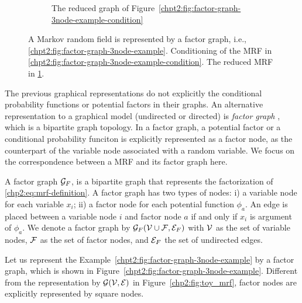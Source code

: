 \begin{figure}[!t]
\begin{subfigure}{.3\textwidth}
    \caption{The reduced graph of Figure~\ref{chpt2:fig:factor-graph-3node-example-condition}}
    \label{chpt2:fig:factor-graph-3node-example-reduced}
  \end{subfigure}
  
  \caption{A Markov random field is represented by a factor graph, i.e., \ref{chpt2:fig:factor-graph-3node-example}. Conditioning of the MRF in \ref{chpt2:fig:factor-graph-3node-example-condition}. The reduced MRF in \ref{chpt2:fig:factor-graph-3node-example-reduced}.}
  \label{chp2:tab:toy-factor-graph}
  \hspace{1cm}
\end{figure}

The previous graphical representations do not explicitly the conditional probability functions or potential factors in their graphs. An alternative representation to a graphical model (undirected or directed) is \textit{factor graph} \cite{kschischang2001factor_graph},
which is a bipartite graph topology. In a factor graph, a potential factor or a conditional probability funciton is explicitly represented as a factor node, as the counterpart of the variable node associated with a random variable. We focus on the correspondence between a MRF and its factor graph here.
\begin{definition}\label{chpt2:def:factor-graph}
  A factor graph $\mathcal{G}_F$, is a bipartite graph that represents the factorization of \eqref{chp2:eq:mrf-definition}. A factor graph has two types of nodes: i) a variable node for each variable $x_i$; ii) a factor node for each potential function $\phi_{a}$. An edge is placed between a variable node $i$ and factor node $a$ if and only if $x_i$ is argument of $\phi_{a}$. We denote a factor graph by $\mathcal{G}_F(\mathcal{V} \cup \mathcal{F}, \mathcal{E}_F)$ with $\mathcal{V}$ as the set of variable nodes, $\mathcal{F}$ as the set of factor nodes, and $\mathcal{E}_F$ the set of undirected edges.
\end{definition}
\begin{example}
  Let us represent the Example~\ref{chpt2:fig:factor-graph-3node-example} by a factor graph, which is shown in Figure~\ref{chpt2:fig:factor-graph-3node-example}. Different from the representation by $\mathcal{G}(\mathcal{V}, \mathcal{E})$ in Figure~\ref{chp2:fig:toy_mrf}, factor nodes are explicitly represented by square nodes.
\end{example}



